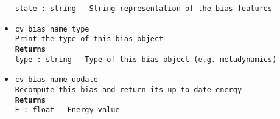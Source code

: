 \begin{itemize}
\texttt{state : string - String representation of the bias features}
\item \texttt{cv bias name type}
\\
\texttt{Print the type of this bias object}
\\
\texttt{\textbf{Returns}}
\\
\texttt{type : string - Type of this bias object (e.g. metadynamics)}
\item \texttt{cv bias name update}
\\
\texttt{Recompute this bias and return its up-to-date energy}
\\
\texttt{\textbf{Returns}}
\\
\texttt{E : float - Energy value}
\end{itemize}
